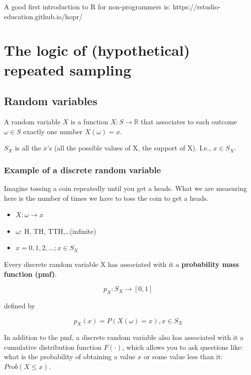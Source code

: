 \documentclass[12pt]{book}\usepackage[]{graphicx}\usepackage[]{color}
\begin{document}
A good first introduction to R for non-programmers is: https://rstudio-education.github.io/hopr/



\chapter{The logic of (hypothetical) repeated sampling}

\section{Random variables}

A random variable $X$ is a function $X : S \rightarrow \mathbb{R}$ that associates to each outcome
$\omega \in S$ exactly one number $X(\omega) = x$.

$S_X$ is all the $x$'s (all the possible values of X, the support of X). I.e., $x \in S_X$.

\subsection{Example of a discrete random variable}

Imagine tossing a coin repeatedly until you get a heads. What we are measuring here is the number of times we have to toss the coin to get a heads.

\begin{itemize}
	\item $X: \omega \rightarrow x$
	\item $\omega$: H, TH, TTH,\dots (infinite)
	\item $x=0,1,2,\dots; x \in S_X$
\end{itemize}

Every discrete random variable X has associated with it a \textbf{probability mass  function (pmf)}. 


\begin{equation}
p_X : S_X \rightarrow [0, 1] 
\end{equation}

defined by

\begin{equation}
p_X(x) = P(X(\omega) = x), x \in S_X
 \end{equation}

In addition to the pmf, a discrete random variable also has associated with it a cumulative distribution function $F(\cdot)$, which allows you to ask questions like: what is the probability of obtaining a value $x$ or some value less than it: $Prob(X\leq x)$. 
\end{document}
